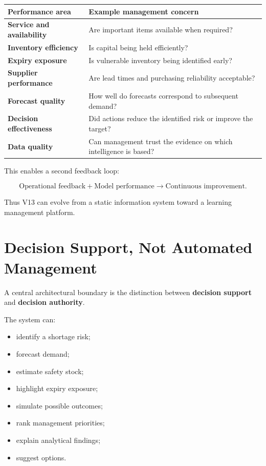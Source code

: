 \documentclass[11pt,a4paper]{article}
\begin{document}
\begin{center}
\renewcommand{\arraystretch}{1.35}
\begin{tabularx}{\textwidth}{>{\bfseries}p{36mm} X}
\toprule
Performance area & Example management concern \\
\midrule
Service and availability & Are important items available when required? \\
Inventory efficiency & Is capital being held efficiently? \\
Expiry exposure & Is vulnerable inventory being identified early? \\
Supplier performance & Are lead times and purchasing reliability acceptable? \\
Forecast quality & How well do forecasts correspond to subsequent demand? \\
Decision effectiveness & Did actions reduce the identified risk or improve the target? \\
Data quality & Can management trust the evidence on which intelligence is based? \\
\bottomrule
\end{tabularx}
\end{center}

This enables a second feedback loop:

\[
\text{Operational feedback}
+
\text{Model performance}
\rightarrow
\text{Continuous improvement}.
\]

Thus V13 can evolve from a static information system toward a learning
management platform.

\section{Decision Support, Not Automated Management}

A central architectural boundary is the distinction between \textbf{decision
support} and \textbf{decision authority}.

The system can:

\begin{itemize}
\item identify a shortage risk;
\item forecast demand;
\item estimate safety stock;
\item highlight expiry exposure;
\item simulate possible outcomes;
\item rank management priorities;
\item explain analytical findings;
\item suggest options.
\end{itemize}
\end{document}
